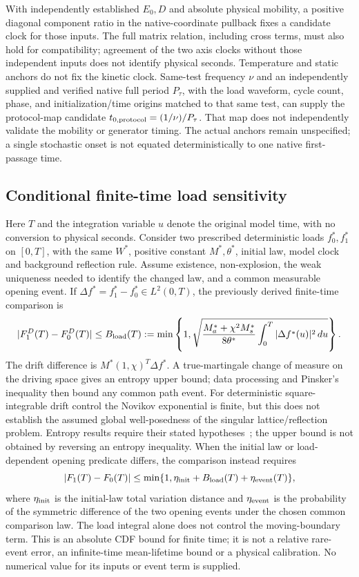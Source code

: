 \documentclass[11pt]{article}
\begin{document}
With independently established $E_0,D$ and absolute physical mobility,
a positive diagonal component ratio in the native-coordinate pullback
fixes a candidate clock for those inputs.
The full matrix relation, including cross terms, must also hold for compatibility;
agreement of the two axis clocks without those independent inputs
does not identify physical seconds.
Temperature and static anchors do not fix the kinetic clock.
Same-test frequency $\nu$ and an independently supplied and verified native
full period $P_\tau$, with the load waveform, cycle count, phase, and
initialization/time origins matched to that same test, can supply the
protocol-map candidate $t_{0,\rm protocol}=(1/\nu)/P_\tau$.
That map does not independently validate the mobility or generator timing.
The actual anchors remain unspecified; a single stochastic onset is
not equated deterministically to one native first-passage time.

\subsection{Conditional finite-time load sensitivity}
Here $T$ and the integration variable $u$ denote the original model time,
with no conversion to physical seconds.
Consider two prescribed deterministic loads $f_0^*,f_1^*$ on $[0,T]$,
with the same $W^*$, positive constant $M^*,\theta^*$, initial law,
model clock and background reflection rule. Assume existence, non-explosion,
the weak uniqueness needed to identify the changed law, and a common measurable
opening event. If $\Delta f^*=f_1^*-f_0^*\in L^2(0,T)$, the previously
derived finite-time comparison is
\begin{equation}
 |F_1^D(T)-F_0^D(T)|\leq B_{\rm load}(T)
 :=\min\left\{1,\sqrt{\frac{M_a^*+\chi^2M_s^*}{8\theta^*}
 \int_0^T |\Delta f^*(u)|^2\,du}\right\}.
\end{equation}
The drift difference is $M^*(1,\chi)^T\Delta f^*$. A true-martingale
change of measure on the driving space gives an entropy upper bound;
data processing and Pinsker's inequality then bound any common path event.
For deterministic square-integrable drift control the Novikov exponential
is finite, but this does not establish the assumed global well-posedness of
the singular lattice/reflection problem. Entropy results require their
stated hypotheses~\cite{Leonard2012,Lehec2025}; the upper bound is not
obtained by reversing an entropy inequality.
When the initial law or load-dependent opening predicate differs, the
comparison instead requires
\begin{equation}
 |F_1(T)-F_0(T)|\leq
 \min\{1,\eta_{\rm init}+B_{\rm load}(T)+\eta_{\rm event}(T)\},
\end{equation}
where $\eta_{\rm init}$ is the initial-law total variation distance and
$\eta_{\rm event}$ is the probability of the symmetric difference of the
two opening events under the chosen common comparison law.
The load integral alone does not control the moving-boundary term.
This is an absolute CDF bound for finite time; it is not a relative rare-event
error, an infinite-time mean-lifetime bound or a physical calibration.
No numerical value for its inputs or event term is supplied.
\end{document}
